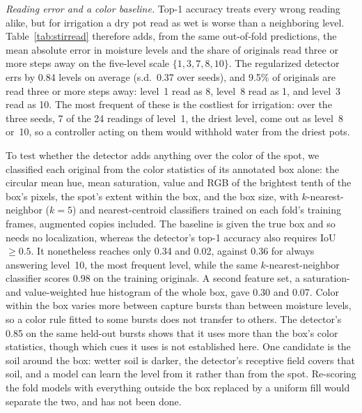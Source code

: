 ﻿\documentclass[journal]{IEEEtran}
\begin{document}
\emph{Reading error and a color baseline.} Top-1 accuracy treats every wrong reading alike, but for irrigation a dry pot read as wet is worse than a neighboring level. Table~\ref{tab:stirread} therefore adds, from the same out-of-fold predictions, the mean absolute error in moisture levels and the share of originals read three or more steps away on the five-level scale $\{1, 3, 7, 8, 10\}$. The regularized detector errs by 0.84 levels on average (s.d.\ 0.37 over seeds), and 9.5\% of originals are read three or more steps away: level~1 read as 8, level~8 read as 1, and level~3 read as 10. The most frequent of these is the costliest for irrigation: over the three seeds, 7 of the 24 readings of level~1, the driest level, come out as level~8 or~10, so a controller acting on them would withhold water from the driest pots.

To test whether the detector adds anything over the color of the spot, we classified each original from the color statistics of its annotated box alone: the circular mean hue, mean saturation, value and RGB of the brightest tenth of the box's pixels, the spot's extent within the box, and the box size, with $k$-nearest-neighbor ($k = 5$) and nearest-centroid classifiers trained on each fold's training frames, augmented copies included. The baseline is given the true box and so needs no localization, whereas the detector's top-1 accuracy also requires IoU~$\geq 0.5$. It nonetheless reaches only 0.34 and 0.02, against 0.36 for always answering level~10, the most frequent level, while the same $k$-nearest-neighbor classifier scores 0.98 on the training originals. A second feature set, a saturation- and value-weighted hue histogram of the whole box, gave 0.30 and 0.07. Color within the box varies more between capture bursts than between moisture levels, so a color rule fitted to some bursts does not transfer to others. The detector's 0.85 on the same held-out bursts shows that it uses more than the box's color statistics, though which cues it uses is not established here. One candidate is the soil around the box: wetter soil is darker, the detector's receptive field covers that soil, and a model can learn the level from it rather than from the spot. Re-scoring the fold models with everything outside the box replaced by a uniform fill would separate the two, and has not been done.
\end{document}
